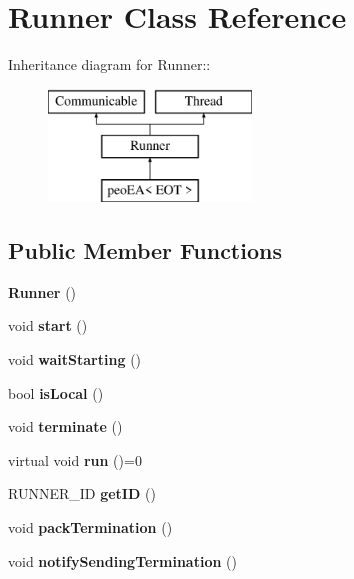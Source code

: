 \section{Runner Class Reference}
\label{class_runner}
Inheritance diagram for Runner::\begin{figure}[H]
\begin{center}
\leavevmode
\includegraphics[height=3cm]{class_runner}
\end{center}
\end{figure}
\subsection*{Public Member Functions}
\begin{CompactItemize}
\item 
{\bf Runner} ()\label{class_runner_7acb8258c21da9daa62f9a177a2e5acd}

\item 
void {\bf start} ()\label{class_runner_7dc4419051fcc5cc9dadd54ecc9cd47d}

\item 
void {\bf wait\-Starting} ()\label{class_runner_5bc239db2be753b77369fa9a038769fd}

\item 
bool {\bf is\-Local} ()\label{class_runner_40adbfb7d6944189b4fff60b02e669ca}

\item 
void {\bf terminate} ()\label{class_runner_0f133e75c28fb8264549814f80608e68}

\item 
virtual void {\bf run} ()=0\label{class_runner_2d306c1835d8710258d2b52b8cc8312c}

\item 
RUNNER\_\-ID {\bf get\-ID} ()\label{class_runner_5026c74eec184e3a15cb3c0ec4200a57}

\item 
void {\bf pack\-Termination} ()\label{class_runner_2ad6d199d684d6f34347fc202ffe2fa3}

\item 
void {\bf notify\-Sending\-Termination} ()\label{class_runner_3591be473e0fcee1105fb57319b529aa}

\end{CompactItemize}
